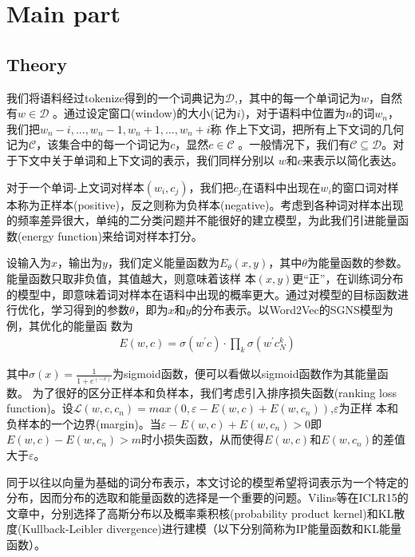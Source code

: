 \documentclass[13pt]{article}
\begin{document}
\section{Main part}
\subsection{Theory}
我们将语料经过tokenize得到的一个词典记为$\mathcal{D}$,，其中的每一个单词记为$w$，自然有$w\in\mathcal{D}$
。通过设定窗口(window)的大小(记为$i$)，对于语料中位置为$n$的词$w_n$，我们把$w_n-i,...,w_n-1,w_n+1,...,w_n+i$称
作上下文词，把所有上下文词的几何记为$\mathcal{C}$，该集合中的每一个词记为$c$，显然$c\in\mathcal{C}$
。一般情况下，我们有$\mathcal{C}\subseteq\mathcal{D}$。对于下文中关于单词和上下文词的表示，我们同样分别以
$w$和$c$来表示以简化表达。

对于一个单词-上文词对样本$(w_i,c_j)$，我们把$c_j$在语料中出现在$w_i$的窗口词对样本称为正样本(positive)，反之则称为负样本(negative)。考虑到各种词对样本出现的频率差异很大，单纯的二分类问题并不能很好的建立模型，为此我们引进能量函数(energy function)来给词对样本打分。

设输入为$x$，输出为$y$，我们定义能量函数为$E_\theta(x,y)$，其中$\theta$为能量函数的参数。能量函数只取非负值，其值越大，则意味着该样
本$(x,y)$更“正”，在训练词分布的模型中，即意味着词对样本在语料中出现的概率更大。通过对模型的目标函数进行优化，学习得到的参数$\theta$，即为$x$和$y$的分布表示。以Word2Vec的SGNS模型为例，其优化的能量函
数为
\begin{align*}
E(w,c)=\sigma(w^{\prime{}}c)\cdot\prod_k\sigma(w^{\prime{}}c_N^k)
\end{align*}

其中$\sigma(x)=\frac{1}{1+e^(-x)}$为sigmoid函数，便可以看做以sigmoid函数作为其能量函数。
为了很好的区分正样本和负样本，我们考虑引入排序损失函数(ranking loss function)。设$\mathcal{L}(w,c,c_n)=max(0,\varepsilon-E(w,c)+E(w,c_n))$,$\varepsilon$为正样
本和负样本的一个边界(margin)。当$\varepsilon-E(w,c)+E(w,c_n)>0$即$E(w,c)-E(w,c_n)>m$时小损失函数，从而使得$E(w,c)$和$E(w,c_n)$的差值大于$\varepsilon$。

同于以往以向量为基础的词分布表示，本文讨论的模型希望将词表示为一个特定的分布，因而分布的选取和能量函数的选择是一个重要的问题。Vilins等在ICLR15的文章中，分别选择了高斯分布以及概率乘积核(probability product kernel)和KL散度(Kullback-Leibler divergence)进行建模（以下分别简称为IP能量函数和KL能量函数）。
\end{document}
